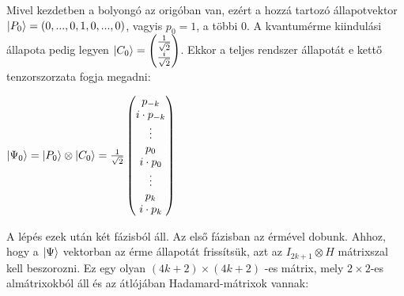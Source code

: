 Mivel kezdetben a bolyongó az origóban van, ezért a hozzá tartozó állapotvektor
$\ket{P_0} = (0, ..., 0, 1, 0, ..., 0)$, vagyis $p_0=1$, a többi $0$. A kvantumérme
kiindulási állapota pedig legyen $\ket{C_0} = \begin{pmatrix} \frac{1}{\sqrt{2}} \\
    \frac{i}{\sqrt{2}}\end{pmatrix}$. Ekkor a teljes rendszer állapotát e kettő
tenzorszorzata fogja megadni:

\begin{center}
  $\ket{\Psi_0} = \ket{P_0} \otimes \ket{C_0}
    = \frac{1}{\sqrt{2}} \begin{pmatrix}
      p_{-k}         \\
      i\cdot{}p_{-k} \\
      \vdots         \\
      p_{0}          \\
      i\cdot{}p_{0}  \\
      \vdots         \\
      p_{k}          \\
      i\cdot{}p_{k}
    \end{pmatrix}
  $
\end{center}

A lépés ezek után két fázisból áll. Az első fázisban az érmével dobunk. Ahhoz, hogy
a $\ket{\Psi}$ vektorban az érme állapotát frissítsük, azt az $I_{2k+1} \otimes H$
mátrixszal kell beszorozni. Ez egy olyan $(4k+2) \times (4k+2)$ -es mátrix, mely
$2 \times 2$-es almátrixokból áll és az átlójában Hadamard-mátrixok vannak:

